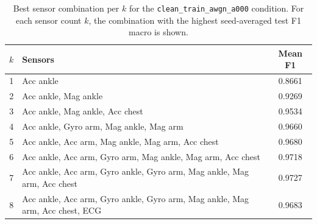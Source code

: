 \begin{table}[H]
    \centering
    \caption{Best sensor combination per $k$ for the \texttt{clean\_train\_awgn\_a000} condition. For each sensor count $k$, the combination with the highest seed-averaged test F1 macro is shown.}
    \label{tab:best_combo_clean_train_awgn_a000}
    \begin{tabular}{clc}
        \toprule
        $k$ & \textbf{Sensors} & \textbf{Mean F1} \\
        \midrule
        1 & Acc ankle & 0.8661 \\
        2 & Acc ankle, Mag ankle & 0.9269 \\
        3 & Acc ankle, Mag ankle, Acc chest & 0.9534 \\
        4 & Acc ankle, Gyro arm, Mag ankle, Mag arm & 0.9660 \\
        5 & Acc ankle, Acc arm, Mag ankle, Mag arm, Acc chest & 0.9680 \\
        6 & Acc ankle, Acc arm, Gyro arm, Mag ankle, Mag arm, Acc chest & 0.9718 \\
        7 & Acc ankle, Acc arm, Gyro ankle, Gyro arm, Mag ankle, Mag arm, Acc chest & 0.9727 \\
        8 & Acc ankle, Acc arm, Gyro ankle, Gyro arm, Mag ankle, Mag arm, Acc chest, ECG & 0.9683 \\
        \bottomrule
    \end{tabular}
\end{table}